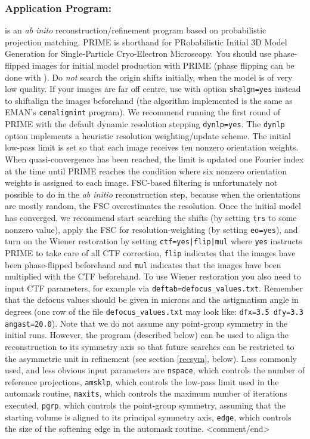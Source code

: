 \subsubsection{Application Program: }
\label{prime3D}
 is an \textit{ab inito} reconstruction/refinement program based on probabilistic projection matching. PRIME is shorthand for PRobabilistic Initial 3D Model Generation for Single-Particle Cryo-Electron Microscopy. You should use phase-flipped images for initial model production with PRIME (phase flipping can be done with ). Do \textit{not} search the origin shifts initially, when the model is of very low quality. If your images are far off centre, use  with option \texttt{shalgn=yes} instead to shiftalign the images beforehand (the algorithm implemented is the same as EMAN's \texttt{cenalignint} program). We recommend running the first round of PRIME with the default dynamic resolution stepping \texttt{dynlp=yes}. The \texttt{dynlp} option implements a heuristic resolution weighting/update scheme. The initial low-pass limit is set so that each image receives ten nonzero orientation weights. When quasi-convergence has been reached, the limit is updated one Fourier index at the time until PRIME reaches the condition where six nonzero orientation weights is assigned to each image. FSC-based filtering is unfortunately not possible to do in the \textit{ab initio} reconstruction step, because when the orientations are mostly random, the FSC overestimates the resolution. Once the initial model has converged, we recommend start searching the shifts (by setting \texttt{trs} to some nonzero value), apply the FSC for resolution-weighting (by setting \texttt{eo=yes}), and turn on the Wiener restoration by setting \texttt{ctf=yes|flip|mul} where \texttt{yes} instructs PRIME to take care of all CTF correction, \texttt{flip} indicates that the images have been phase-flipped beforehand and \texttt{mul} indicates that the images have been multiplied with the CTF beforehand. To use Wiener restoration you also need to input CTF parameters, for example via \texttt{deftab=defocus\_values.txt}. Remember that the defocus values should be given in microns and the astigmatism angle in degrees (one row of the file \texttt{defocus\_values.txt} may look like: \texttt{dfx=3.5  dfy=3.3  angast=20.0}). Note that we do not assume any point-group symmetry in the initial runs. However, the  program (described below) can be used to align the reconstruction to its symmetry axis so that future searches can be restricted to the asymmetric unit in refinement (see section \ref{recsym}, below). Less commonly used, and less obvious input parameters are \texttt{nspace}, which controls the number of reference projections, \texttt{amsklp}, which controls the low-pass limit used in the automask routine, \texttt{maxits}, which controls the maximum number of iterations executed, \texttt{pgrp}, which controls the point-group symmetry, assuming that the starting volume is aligned to its principal symmetry axis, \texttt{edge}, which controls the size of the softening edge in the automask routine. <comment/end>\\

